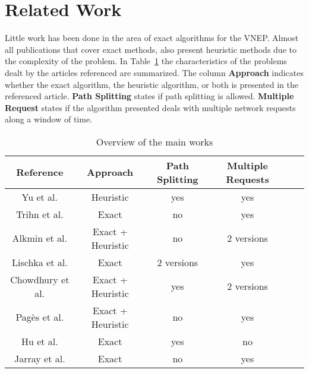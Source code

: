 \section{Related Work}
\label{sec:relwork}
Little work has been done in the area of exact algorithms for the VNEP\@. Almost all publications that cover exact methods, also present heuristic methods due to the complexity of the problem. In Table~\ref{tab:papers} the characteristics of the problems dealt by the articles referenced are summarized. The column \textbf{Approach} indicates whether the exact algorithm, the heuristic algorithm, or both is presented in the referenced article. \textbf{Path Splitting} states if path splitting is allowed. \textbf{Multiple Request} states if the algorithm presented deals with multiple network requests along a window of time.

\begin{table}[h]
\begin{center}
  \caption{Overview of the main works\label{tab:papers}}
  \begin{tabular}{c c c c c c}
  Reference                               & Approach            & Path Splitting & Multiple Requests \\
  \hline
  Yu et al. \cite{Yu2008}                 & Heuristic           & yes        & yes \\
  Trihn et al. \cite{Trinh:2011}          & Exact               & no         & yes \\
  Alkmin et al. \cite{Alkmim2013}         & Exact + Heuristic   & no         & 2 versions \\
  Lischka et al.   \cite{Lischka2009}     & Exact               & 2 versions  & yes \\
  Chowdhury et al. \cite{Chowdhury:2012}  & Exact + Heuristic   & yes         & 2 versions \\
  Pag\`{e}s et al. \cite{Pages:2012}      & Exact + Heuristic   & no          & yes \\
  Hu et al. \cite{hu:2013}                & Exact               & yes         & no \\
  Jarray et al. \cite{Jarray2012}         & Exact               & no          & yes \\
  \end{tabular}
\end{center}
\end{table}

